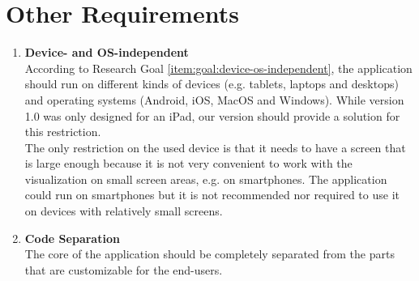 \section{Other Requirements}\label{sec:other-requirements}

\begin{enumerate}[label=\textbf{\arabic*}., ref=\arabic*]
	\item \textbf{Device- and OS-independent\label{item:device-os-independent}} \hfill \\
	According to Research Goal \ref{item:goal:device-os-independent}, the application should run on different kinds of devices (e.g. tablets, laptops and desktops) and operating systems (Android, iOS, MacOS and Windows). While version 1.0 was only designed for an iPad, our version should provide a solution for this restriction.\\
	The only restriction on the used device is that it needs to have a screen that is large enough because it is not very convenient to work with the visualization on small screen areas, e.g. on smartphones. The application could run on smartphones but it is not recommended nor required to use it on devices with relatively small screens.
	
	\item \textbf{Code Separation\label{item:code-separation}} \hfill \\
	The core of the application should be completely separated from the parts that are customizable for the end-users.

\end{enumerate}
